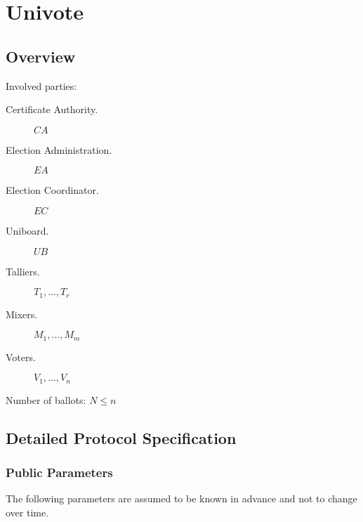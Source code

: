 \documentclass[bibtotoc,halfparskip,oneside]{scrreprt}
\newcommand{\CA}{\ensuremath{\mathit{CA}}\xspace}
\newcommand{\EA}{\ensuremath{\mathit{EA}}\xspace}
\newcommand{\EC}{\ensuremath{\mathit{EC}}\xspace}
\newcommand{\UB}{\ensuremath{\mathit{UB}}\xspace}
\newcommand{\Tallier}[1]{\ensuremath{\mathit{T}_{#1}}\xspace}
\newcommand{\Mixer}[1]{\ensuremath{\mathit{M}_{#1}}\xspace}
\newcommand{\Voter}[1]{\ensuremath{\mathit{V}_{#1}}\xspace}
\begin{document}
\chapter{Univote}

\section{Overview}

Involved parties:

\begin{description}
	\item[Certificate Authority.] \CA
	\item[Election Administration.] \EA
	\item[Election Coordinator.] \EC
	\item[Uniboard.] \UB
	\item[Talliers.] $\Tallier{1},\ldots,\Tallier{r}$
	\item[Mixers.] $\Mixer{1},\ldots,\Mixer{m}$
	\item[Voters.] $\Voter{1},\ldots,\Voter{n}$
\end{description}

Number of ballots: $N\leq n$

\section{Detailed Protocol Specification}

\subsection{Public Parameters}

The following parameters are assumed to be known in advance and not to change over time.
\end{document}
